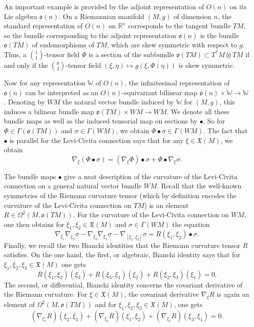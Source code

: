 \documentclass[12pt,a4paper]{amsart}
\def\frak{\mathfrak}
\def\Bbb{\mathbb}
\newcommand{\x}{\times}
\newcommand{\si}{\sigma}
\newcommand{\Ga}{\Gamma}
\newcommand{\Ph}{\Phi}
\newcommand{\Om}{\Omega}
\numberwithin{theorem}{section}
\numberwithin{equation}{section}
\theoremstyle{definition}
\theoremstyle{remark}
\begin{document}
An important example is provided by the adjoint representation of $O(n)$ on its Lie
algebra $\frak o(n)$. On a Riemannian manifold $(M,g)$ of dimension $n$, the standard
representation of $O(n)$ on $\Bbb R^n$ corresponds to the tangent bundle $TM$, so the
bundle corresponding to the adjoint representation $\frak o(n)$ is the bundle $\frak
o(TM)$ of endomorphisms of $TM$, which are skew symmetric with respect to $g$.  Thus,
a $\binom11$-tensor field $\Ph$ is a section of the subbundle $\frak o(TM)\subset
T^*M\otimes TM$ if and only if the $\binom02$-tensor field $(\xi,\eta)\mapsto
g(\xi,\Ph(\eta))$ is skew symmetric.

Now for any representation $\Bbb W$ of $O(n)$, the infinitesimal representation of
$\frak o(n)$ can be interpreted as an $O(n)$-equivariant bilinear map $\frak
o(n)\times\Bbb W\to\Bbb W$. Denoting by $WM$ the natural vector bundle induced by
$\Bbb W$ for $(M,g)$, this induces a bilinear bundle map $\frak o(TM)\x WM\to WM$. We
denote all these bundle maps as well as the induced tensorial map on sections by
$\bullet$. So for $\Phi\in\Ga(\frak o(TM))$ and $\si\in\Ga(WM)$, we obtain
$\Phi\bullet\si\in\Ga(WM)$. The fact that $\bullet$ is parallel for the Levi-Civita
connection says that for any $\xi\in\frak X(M)$, we obtain
\begin{equation}\label{bull-diff}
\nabla_\xi (\Phi\bullet\si)=(\nabla_\xi\Phi)\bullet\si+\Phi\bullet\nabla_\xi\si. 
\end{equation}

The bundle maps $\bullet$ give a neat description of the curvature of the Levi-Civita
connection on a general natural vector bundle $WM$. Recall that the well-known
symmetries of the Riemann curvature tensor (which by definition encodes the curvature
of the Levi-Civita connection on $TM$) is an element $R\in\Om^2(M,\frak o(TM))$. For
the curvature of the Levi-Civita connection on $WM$, one then obtains for
$\xi_1,\xi_2\in\frak X(M)$ and $\si\in\Ga(WM)$ the equation
\begin{equation}\label{curv-W}
  \nabla_{\xi_1}\nabla_{\xi_2}\si-\nabla_{\xi_2}\nabla_{\xi_1}\si-\nabla_{[\xi_1,\xi_2]}\si=
  R(\xi_1,\xi_2)\bullet\si.
\end{equation}
Finally, we recall the two Bianchi identities that the Riemann curvature tensor $R$
satisfies. On the one hand, the first, or algebraic, Bianchi identity says that for
$\xi_1,\xi_2,\xi_3\in\frak X(M)$ one gets
\begin{equation}\label{Bianchi1}
R(\xi_1,\xi_2)(\xi_3)+R(\xi_3,\xi_1)(\xi_2)+R(\xi_2,\xi_3)(\xi_1)=0. 
\end{equation}
The second, or differential, Bianchi identity concerns the covariant derivative of the
Riemann curvature. For $\xi\in\frak X(M)$, the covariant derivative $\nabla_\xi R$ is
again an element of $\Om^2(M,\frak o(TM))$ and for $\xi_1,\xi_2,\xi_3\in\frak X(M)$,
one gets
\begin{equation}\label{Bianchi2}
(\nabla_{\xi_1}R)(\xi_2,\xi_3)+(\nabla_{\xi_3}R)(\xi_1,\xi_2)+(\nabla_{\xi_2}R)(\xi_3,\xi_1)=0.
\end{equation}
\end{document}
